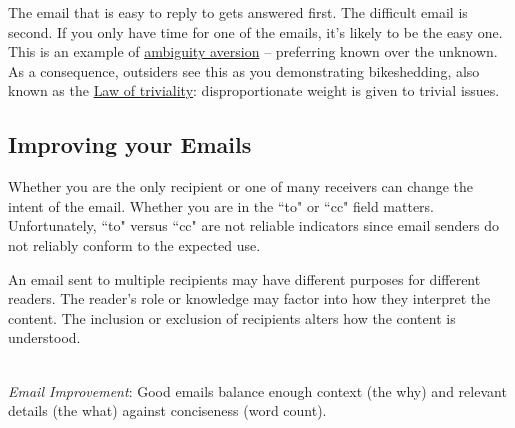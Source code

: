 The email that is easy to reply to gets answered first.  The difficult email is second.
If you only have time for one of the emails, it's likely to be the easy one. This is an example of 
\href{https://en.wikipedia.org/wiki/Ambiguity_aversion}{ambiguity aversion} -- preferring known over the unknown.
\iftoggle{WPinmargin}{\marginpar{$>$Wikipedia: Ambiguity\\aversion}}{}
As a consequence, outsiders see this as you demonstrating bikeshedding, also known as the
\href{https://en.wikipedia.org/wiki/Law_of_triviality}{Law of triviality}: disproportionate weight is given to trivial issues.



\subsection*{Improving your Emails\label{sec:email-structure}}


Whether you are the only recipient or one of many receivers can change the intent of the email. Whether you are in the ``to" or ``cc" field matters. Unfortunately, ``to" versus ``cc" are not reliable indicators since email senders do not reliably conform to the expected use. 



An email sent to multiple recipients may have different purposes for different readers. The reader's role or knowledge may factor into how they interpret the content. The inclusion or exclusion of recipients alters how the content is understood. 

\ \\
\textit{Email Improvement}: Good emails balance enough context (the why) and relevant details (the what) against conciseness (word count). 

